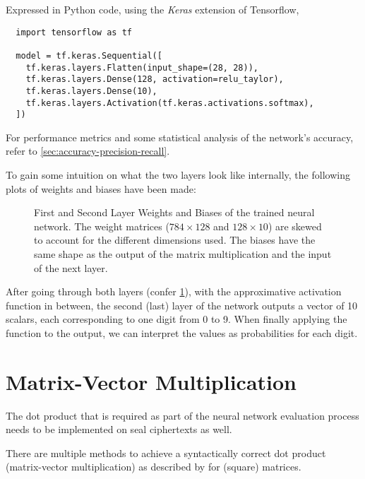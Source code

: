Expressed in Python code, using the \textit{Keras} extension of Tensorflow,
\begin{verbatim}
  import tensorflow as tf

  model = tf.keras.Sequential([
    tf.keras.layers.Flatten(input_shape=(28, 28)),
    tf.keras.layers.Dense(128, activation=relu_taylor),
    tf.keras.layers.Dense(10),
    tf.keras.layers.Activation(tf.keras.activations.softmax),
  ])
\end{verbatim}

For performance metrics and some statistical analysis of the network's accuracy, refer to \cref{sec:accuracy-precision-recall}.

To gain some intuition on what the two layers look like internally, the following plots of weights and biases have been made:
\begin{figure}[H]
  \centering
  \caption[Weights and biases of our neural network]{
    First and Second Layer Weights and Biases of the trained neural network.
    The weight matrices ($784 \times 128$ and $128 \times 10$) are skewed to account for the different dimensions used.
    The biases have the same shape as the output of the matrix multiplication and the input of the next layer.
  }
  \label{fig:layer-1-and-2}
\end{figure}

After going through both layers (confer \cref{fig:layer-1-and-2}), with the approximative  activation function in between, the second (last) layer of the network outputs a vector of 10 scalars, each corresponding to one digit from 0 to 9.
When finally applying the  function to the output, we can interpret the values as probabilities for each digit.

\pagebreak
\section{Matrix-Vector Multiplication}
\label{sec:matmul}
The dot product that is required as part of the neural network evaluation process needs to be implemented on \gls{seal} ciphertexts as well.

There are multiple methods to achieve a syntactically correct dot product (matrix-vector multiplication) as described by \textcite{2018-gazelle} for (square) matrices.


